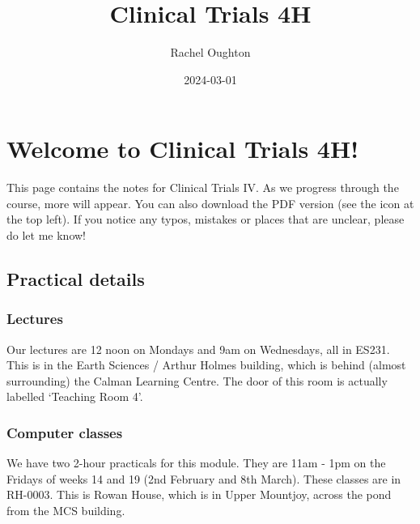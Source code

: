 \documentclass[
  openany]{book}
\title{Clinical Trials 4H}
\author{Rachel Oughton}
\date{2024-03-01}
\theoremstyle{definition}
\theoremstyle{definition}
\theoremstyle{definition}
\theoremstyle{definition}
\theoremstyle{remark}
\begin{document}
\maketitle

{
\setcounter{tocdepth}{1}
\tableofcontents
}
\hypertarget{welcome-to-clinical-trials-4h}{%
\chapter*{Welcome to Clinical Trials 4H!}\label{welcome-to-clinical-trials-4h}}

This page contains the notes for Clinical Trials IV. As we progress through the course, more will appear. You can also download the PDF version (see the icon at the top left). If you notice any typos, mistakes or places that are unclear, please do let me know!

\hypertarget{practical-details}{%
\section*{Practical details}\label{practical-details}}

\hypertarget{lectures}{%
\subsection*{Lectures}\label{lectures}}

Our lectures are 12 noon on Mondays and 9am on Wednesdays, all in ES231. This is in the Earth Sciences / Arthur Holmes building, which is behind (almost surrounding) the Calman Learning Centre. The door of this room is actually labelled `Teaching Room 4'.

\hypertarget{computer-classes}{%
\subsection*{Computer classes}\label{computer-classes}}

We have two 2-hour practicals for this module. They are 11am - 1pm on the Fridays of weeks 14 and 19 (2nd February and 8th March). These classes are in RH-0003. This is Rowan House, which is in Upper Mountjoy, across the pond from the MCS building.
\end{document}
